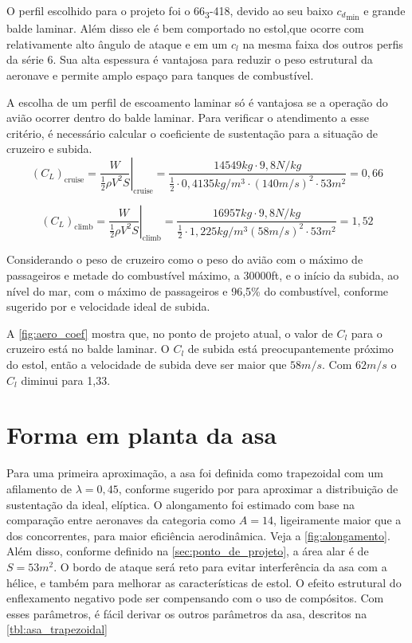 O perfil escolhido para o projeto foi o 66\textsubscript{3}-418, devido ao seu baixo ${c_d}_{\min}$ e grande balde laminar. Além disso ele é bem comportado no estol,que ocorre com relativamente alto ângulo de ataque e em um $c_l$ na mesma faixa dos outros perfis da série 6. Sua alta espessura é vantajosa para reduzir o peso estrutural da aeronave e permite amplo espaço para tanques de combustível.

A escolha de um perfil de escoamento laminar só é vantajosa se a operação do avião ocorrer dentro do balde laminar. Para verificar o atendimento a esse critério, é necessário calcular o coeficiente de sustentação para a situação de cruzeiro e subida.
\begin{equation}
  (C_L)_{\text{cruise}} =
    \left.
      \frac {W} {\frac{1}{2} \rho V^2 S}
    \right|_{\text{cruise}} =
    \frac
      {14549\si{kg} \cdot 9,8\si{N/kg} }
      {\frac{1}{2} \cdot 0,4135 \si{kg/m^3} \cdot (140\si{m/s})^2 \cdot 53 \si{m^2}}
    = 0,66
\end{equation}

\begin{equation}
  (C_L)_{\text{climb}} =
    \left.\frac
      {W}
      {\frac{1}{2} \rho V^2 S}
    \right|_{\text{climb}} =
    \frac
      {16957\si{kg} \cdot 9,8\si{N/kg}}
      {\frac{1}{2} \cdot 1,225 \si{kg/m^3}
    (58\si{m/s})^2 \cdot 53 \si{m^2}}
    = 1,52
\end{equation}

Considerando o peso de cruzeiro como o peso do avião com o máximo de passageiros e metade do combustível máximo, a 30000ft, e o início da subida, ao nível do mar, com o máximo de passageiros e 96,5\% do combustível, conforme sugerido por \cite{roskam} e velocidade ideal de subida.

A \autoref{fig:aero_coef} mostra que, no ponto de projeto atual, o valor de
$C_l$ para o cruzeiro está no balde laminar. O $C_l$ de subida está preocupantemente próximo do estol, então a velocidade de subida deve ser maior que $58\si{m/s}$. Com $62\si{m/s}$ o $C_l$ diminui para 1,33.

\section{Forma em planta da asa}
\label{formaemplanta_asa}

Para uma primeira aproximação, a asa foi definida como trapezoidal com um afilamento de $\lambda = 0,45$, conforme sugerido por \cite{raymer2012aircraft} para aproximar a distribuição de sustentação da ideal, elíptica. O alongamento foi estimado com base na comparação entre aeronaves da categoria como $A = 14$, ligeiramente maior que a dos concorrentes, para maior eficiência aerodinâmica. Veja a \autoref{fig:alongamento}. Além disso, conforme definido na \autoref{sec:ponto_de_projeto}, a área alar é de $S=53\si{m^2}$. O bordo de ataque será reto para evitar interferência da asa com a hélice, e também para melhorar as características de estol. O efeito estrutural do enflexamento negativo pode ser compensando com o uso de compósitos. Com esses parâmetros, é fácil derivar os outros parâmetros da asa, descritos na \autoref{tbl:asa_trapezoidal}

